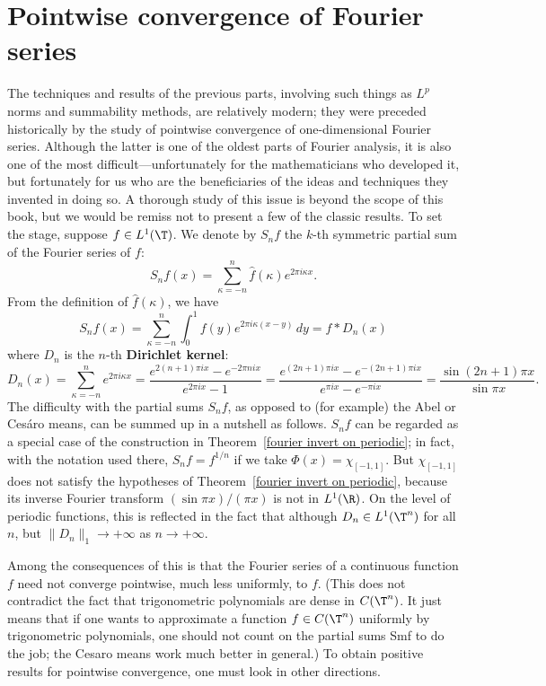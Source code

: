 \section{Pointwise convergence of Fourier series}
The techniques and results of the previous parts, involving such things as $L^p$ norms and summability methods, are relatively modern; they were preceded historically by the study of pointwise convergence of one-dimensional Fourier series. Although the latter is one of the oldest parts of Fourier analysis, it is also one of the most difficult---unfortunately for the mathematicians who developed it, but fortunately for us who are the beneficiaries of the ideas and techniques they invented in doing so. A thorough study of this issue is beyond the scope of this book, but we would be remiss not to present a few of the classic results. To set the stage, suppose $f\in L^1(\T)$. We denote by $S_nf$ the $k$-th symmetric partial sum of the Fourier series of $f$:
\[S_nf(x)=\sum_{\kappa=-n}^{n}\hat{f}(\kappa)e^{2\pi i\kappa x}.\]
From the definition of $\hat{f}(\kappa)$, we have
\[S_nf(x)=\sum_{\kappa=-n}^{n}\int_{0}^{1}f(y)e^{2\pi i\kappa(x-y)}\,dy=f\ast D_n(x)\]
where $D_n$ is the $n$-th \textbf{Dirichlet kernel}:
\[D_n(x)=\sum_{\kappa=-n}^{n}e^{2\pi i\kappa x}=\frac{e^{2(n+1)\pi ix}-e^{-2\pi nix}}{e^{2\pi ix}-1}=\frac{e^{(2n+1)\pi ix}-e^{-(2n+1)\pi ix}}{e^{\pi ix}-e^{-\pi ix}}=\frac{\sin(2n+1)\pi x}{\sin\pi x}.\]
The difficulty with the partial sums $S_nf$, as opposed to (for example) the Abel or Ces\'aro means, can be summed up in a nutshell as follows. $S_nf$ can be regarded as a special case of the construction in Theorem~\ref{fourier invert on periodic}; in fact, with the notation used there, $S_nf=f^{1/n}$ if we take $\Phi(x)=\chi_{[-1,1]}$. But $\chi_{[-1,1]}$ does not satisfy the hypotheses of Theorem~\ref{fourier invert on periodic}, because its inverse Fourier transform $(\sin\pi x)/(\pi x)$ is not in $L^1(\R)$. On the level of periodic functions, this is reflected in the fact that although $D_n\in L^1(\T^n)$ for all $n$, but $\|D_n\|_1\to+\infty$ as $n\to+\infty$.\par
Among the consequences of this is that the Fourier series of a continuous function $f$ need not converge pointwise, much less uniformly, to $f$. (This does not contradict the fact that trigonometric polynomials are dense in $C(\T^n)$. It just means that if one wants to approximate a function $f\in C(\T^n)$ uniformly by trigonometric polynomials, one should not count on the partial sums Smf to do the job; the Cesaro means work much better in general.) To obtain positive results for pointwise convergence, one must look in other directions.\par

